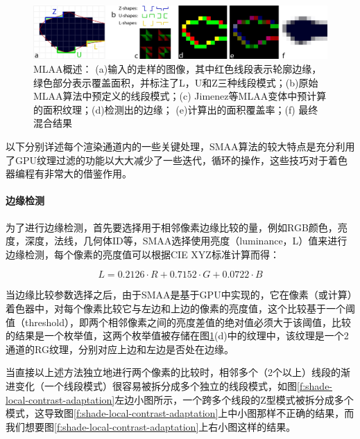 \begin{figure}
\begin{fullwidth}
	\includegraphics[width=1.0\thewidth]{figures/shade/smaa}
	\caption{MLAA概述： (a)输入的走样的图像，其中红色线段表示轮廓边缘，绿色部分表示覆盖面积，并标注了L，U和Z三种线段模式；(b)原始MLAA算法中预定义的线段模式；(c) Jimenez等MLAA变体中预计算的面积纹理；(d)检测出的边缘； (e)计算出的面积覆盖率；(f) 最终混合结果}
	\label{f:shade-smaa}
\end{fullwidth}
\end{figure}

以下分别详述每个渲染通道内的一些关键处理，SMAA算法的较大特点是充分利用了GPU纹理过滤的功能以大大减少了一些迭代，循环的操作，这些技巧对于着色器编程有非常大的借鉴作用。





\paragraph{边缘检测}
为了进行边缘检测，首先要选择用于相邻像素边缘比较的量，例如RGB颜色，亮度，深度，法线，几何体ID等，SMAA选择使用亮度（luminance，L）值来进行边缘检测，每个像素的亮度值可以根据CIE XYZ标准计算而得：

\begin{equation}
	L=0.2126\cdot R+0.7152\cdot G+0.0722\cdot B
\end{equation}

当边缘比较参数选择之后，由于SMAA是基于GPU中实现的，它在像素（或计算）着色器中，对每个像素比较它与左边和上边的像素的亮度值，这个比较基于一个阈值（threshold），即两个相邻像素之间的亮度差值的绝对值必须大于该阈值，比较的结果是一个枚举值，这两个枚举值被存储在图\ref{f:shade-smaa}(d)中的纹理中，该纹理是一个2通道的RG纹理，分别对应上边和左边是否处在边缘。

当直接以上述方法独立地进行两个像素的比较时，相邻多个（2个以上）线段的渐进变化（一个线段模式）很容易被拆分成多个独立的线段模式，如图\ref{f:shade-local-contrast-adaptation}左边小图所示，一个跨多个线段的Z型模式被拆分成多个模式，这导致图\ref{f:shade-local-contrast-adaptation}上中小图那样不正确的结果，而我们想要图\ref{f:shade-local-contrast-adaptation}上右小图这样的结果。


